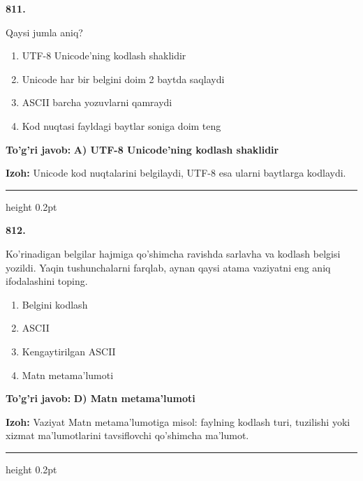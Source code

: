 \documentclass[10pt,a4paper,oneside]{article}
\begin{document}
\noindent\textbf{\color{ink}811.}
\par
Qaysi jumla aniq?
\begin{enumerate}[label=\Alph*),leftmargin=9mm]
\item UTF-8 Unicode'ning kodlash shaklidir
\item Unicode har bir belgini doim 2 baytda saqlaydi
\item ASCII barcha yozuvlarni qamraydi
\item Kod nuqtasi fayldagi baytlar soniga doim teng
\end{enumerate}
\begin{tcolorbox}[enhanced,breakable,colback=teal!4,colframe=teal!50!black,boxrule=0.5pt,arc=1.1mm,left=3mm,right=3mm,top=1.7mm,bottom=1.7mm,before skip=2mm,after skip=2mm]
\textbf{\color{teal}To'g'ri javob:} \textbf{A) UTF-8 Unicode'ning kodlash shaklidir}
\par\smallskip
\textbf{Izoh:} Unicode kod nuqtalarini belgilaydi, UTF-8 esa ularni baytlarga kodlaydi.
\end{tcolorbox}
\vspace{2mm}\hrule height 0.2pt \vspace{3mm}

\noindent\textbf{\color{ink}812.}
\par
Ko'rinadigan belgilar hajmiga qo'shimcha ravishda sarlavha va kodlash belgisi yozildi. Yaqin tushunchalarni farqlab, aynan qaysi atama vaziyatni eng aniq ifodalashini toping.
\begin{enumerate}[label=\Alph*),leftmargin=9mm]
\item Belgini kodlash
\item ASCII
\item Kengaytirilgan ASCII
\item Matn metama'lumoti
\end{enumerate}
\begin{tcolorbox}[enhanced,breakable,colback=teal!4,colframe=teal!50!black,boxrule=0.5pt,arc=1.1mm,left=3mm,right=3mm,top=1.7mm,bottom=1.7mm,before skip=2mm,after skip=2mm]
\textbf{\color{teal}To'g'ri javob:} \textbf{D) Matn metama'lumoti}
\par\smallskip
\textbf{Izoh:} Vaziyat Matn metama'lumotiga misol: faylning kodlash turi, tuzilishi yoki xizmat ma'lumotlarini tavsiflovchi qo'shimcha ma'lumot.
\end{tcolorbox}
\vspace{2mm}\hrule height 0.2pt \vspace{3mm}
\end{document}
